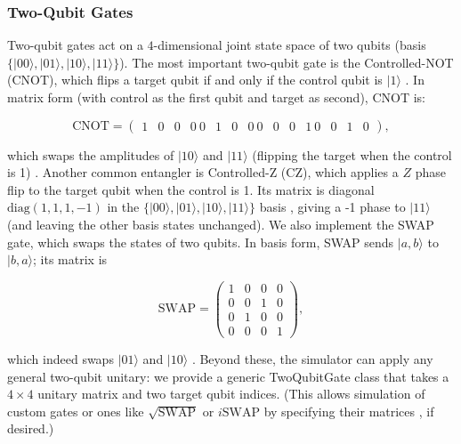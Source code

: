 \documentclass{beamer}
\begin{document}
\begin{frame}
\frametitle{Two-Qubit Gates}

Two-qubit gates act on a $4$-dimensional joint state space of two
qubits (basis $\{\vert 00\rangle,\vert 01\rangle,\vert 10\rangle,\vert 11\rangle\}$). The
most important two-qubit gate is the Controlled-NOT (CNOT), which
flips a target qubit if and only if the control qubit is $|1\rangle$
. In matrix form (with control as the first qubit and target as
second), CNOT is:

\[ \text{CNOT} = \begin{pmatrix}
1 & 0 & 0 & 0\
0 & 1 & 0 & 0\
0 & 0 & 0 & 1\
0 & 0 & 1 & 0
\end{pmatrix},
\]

which swaps the amplitudes of $|10\rangle$ and $|11\rangle$ (flipping
the target when the control is 1) . Another common entangler is
Controlled-Z (CZ), which applies a $Z$ phase flip to the target qubit
when the control is 1. Its matrix is diagonal
$\mathrm{diag}(1,1,1,-1)$ in the
$\{\vert 00\rangle,\vert 01\rangle,\vert 10\rangle,\vert 11\rangle\}$ basis , giving a -1
phase to $|11\rangle$ (and leaving the other basis states
unchanged). We also implement the SWAP gate, which swaps the states of
two qubits. In basis form, SWAP sends $|a,b\rangle$ to $|b,a\rangle$;
its matrix is

\[
\text{SWAP} = \begin{pmatrix} 1 & 0 & 0 & 0\\ 0 & 0 & 1 & 0\\ 0 & 1 & 0 & 0\\ 0 & 0 & 0 & 1 \end{pmatrix},
\]

which indeed swaps $|01\rangle$ and $|10\rangle$ . Beyond these, the
simulator can apply any general two-qubit unitary: we provide a
generic TwoQubitGate class that takes a $4\times4$ unitary matrix and
two target qubit indices. (This allows simulation of custom gates or
ones like $\sqrt{\text{SWAP}}$ or $i\text{SWAP}$ by specifying their
matrices , if desired.)
\end{frame}
\end{document}
